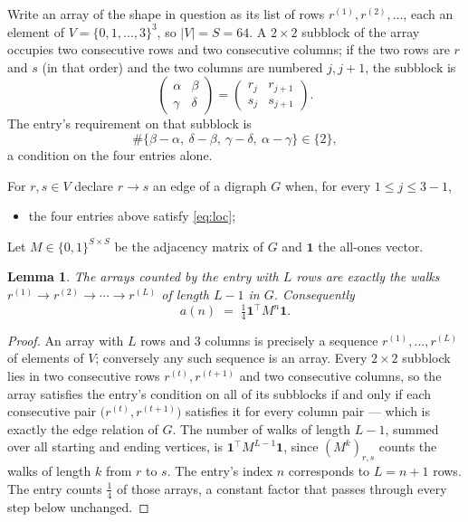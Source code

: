 \documentclass[11pt,a4paper]{article}
\theoremstyle{plain}
\newtheorem{lemma}[theorem]{Lemma}
\theoremstyle{definition}
\begin{document}
Write an array of the shape in question as its list of rows
$r^{(1)},r^{(2)},\dots$, each an element of
$V=\{0,1,\dots,3\}^{3}$, so $|V|=S=64$. A $2\times2$ subblock of the array
occupies two consecutive rows and two consecutive columns; if the two rows are $r$
and $s$ (in that order) and the two columns are numbered $j,j+1$,
the subblock is
\[
\begin{pmatrix}\alpha&\beta\\\gamma&\delta\end{pmatrix}=\begin{pmatrix}r_j&r_{j+1}\\s_j&s_{j+1}\end{pmatrix}.
\]
The entry's requirement on that subblock is
\begin{equation}\label{eq:loc}
\#\{\beta-\alpha,\ \delta-\beta,\ \gamma-\delta,\ \alpha-\gamma\}\in\{2\},
\end{equation}
a condition on the four entries alone.

For $r,s\in V$ declare $r\to s$ an edge of a digraph $G$ when, for every
$1\le j\le 3-1$,
\begin{itemize}
\item the four entries above satisfy \eqref{eq:loc};

\end{itemize}
Let $M\in\{0,1\}^{S\times S}$ be the adjacency matrix of $G$ and $\mathbf{1}$ the
all-ones vector.

\begin{lemma}\label{lem:walk}
The arrays counted by the entry with $L$ rows are exactly the walks
$r^{(1)}\to r^{(2)}\to\cdots\to r^{(L)}$ of length $L-1$ in $G$. Consequently
\[
a(n)\;=\;\tfrac1{4}\mathbf{1}^{\!\top}M^{n}\mathbf{1} .
\]
\end{lemma}

\begin{proof}
An array with $L$ rows and $3$ columns is precisely a sequence
$r^{(1)},\dots,r^{(L)}$ of elements of $V$; conversely any such sequence is an array.
Every $2\times2$ subblock lies in two consecutive rows $r^{(t)},r^{(t+1)}$ and two
consecutive columns, so the array satisfies the entry's condition on all of its subblocks
if and only if each consecutive pair $\bigl(r^{(t)},r^{(t+1)}\bigr)$ satisfies it for
every column pair --- which is exactly the edge relation of $G$. The number of walks of
length $L-1$, summed over all starting and ending vertices, is
$\mathbf{1}^{\!\top}M^{L-1}\mathbf{1}$, since $(M^{k})_{r,s}$ counts the walks of
length $k$ from $r$ to $s$. The entry's index $n$ corresponds to $L=n+1$ rows. The entry counts $\tfrac1{4}$ of those arrays, a constant factor that passes through every step below unchanged.
\end{proof}
\end{document}
